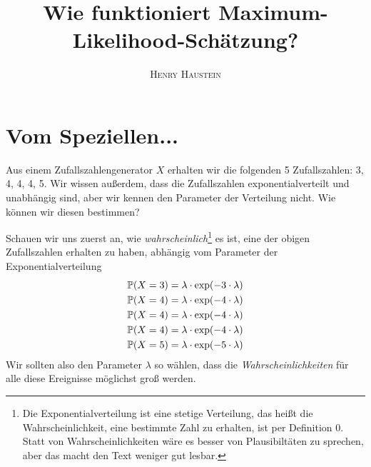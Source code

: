 \documentclass{article}
\title{\textbf{Wie funktioniert Maximum-Likelihood-Schätzung?}}
\author{\textsc{Henry Haustein}}
\date{}
\begin{document}
	\maketitle
	
	\section*{Vom Speziellen...}
	Aus einem Zufallszahlengenerator $X$ erhalten wir die folgenden 5 Zufallszahlen: 3, 4, 4, 4, 5. Wir wissen außerdem, dass die Zufallszahlen exponentialverteilt und unabhängig sind, aber wir kennen den Parameter der Verteilung nicht. Wie können wir diesen bestimmen?
	
	Schauen wir uns zuerst an, wie \textit{wahrscheinlich}\footnote{Die Exponentialverteilung ist eine stetige Verteilung, das heißt die Wahrscheinlichkeit, eine bestimmte Zahl zu erhalten, ist per Definition 0. Statt von Wahrscheinlichkeiten wäre es besser von Plausibiltäten zu sprechen, aber das macht den Text weniger gut lesbar.} es ist, eine der obigen Zufallszahlen erhalten zu haben, abhängig vom Parameter der Exponentialverteilung
	\begin{align}
		\mathbb{P}(X=3) &= \lambda\cdot \exp(-3\cdot \lambda) \notag \\
		\mathbb{P}(X=4) &= \lambda\cdot \exp(-4\cdot \lambda) \notag \\
		\mathbb{P}(X=4) &= \lambda\cdot \exp(-4\cdot \lambda) \notag \\
		\mathbb{P}(X=4) &= \lambda\cdot \exp(-4\cdot \lambda) \notag \\
		\mathbb{P}(X=5) &= \lambda\cdot \exp(-5\cdot \lambda) \notag
	\end{align}
	Wir sollten also den Parameter $\lambda$ so wählen, dass die \textit{Wahrscheinlichkeiten} für alle diese Ereignisse möglichst groß werden.
	
\end{document}
